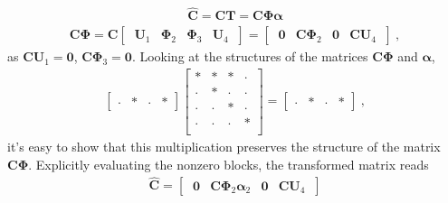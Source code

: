 \documentclass[letterpaper,10pt,english]{jupyterBook}
\begin{document}
\sphinxAtStartPar
{}
\begin{equation*}
\begin{split}\hat{\mathbf{C}} = \mathbf{C} \mathbf{T} = \mathbf{C} \boldsymbol\Phi \boldsymbol\alpha\end{split}
\end{equation*}\begin{equation*}
\begin{split}\mathbf{C} \boldsymbol\Phi = \mathbf{C} \begin{bmatrix} \ \mathbf{U}_1 & \boldsymbol\Phi_2 & \boldsymbol\Phi_3 & \mathbf{U}_4 \ \end{bmatrix} = \begin{bmatrix} \ \mathbf{0}   & \mathbf{C} \boldsymbol\Phi_2 & \mathbf{0} & \mathbf{C} \mathbf{U}_4 \ \end{bmatrix} \ ,\end{split}
\end{equation*}
\sphinxAtStartPar
as \(\mathbf{C} \mathbf{U}_1 = \mathbf{0}\), \(\mathbf{C} \boldsymbol\Phi_3 = \mathbf{0}\). Looking at the structures of the matrices \(\mathbf{C} \boldsymbol\Phi\) and \(\boldsymbol\alpha\),
\begin{equation*}
\begin{split}
\begin{bmatrix} \cdot & \ast & \cdot & \ast \end{bmatrix}
\begin{bmatrix} 
  \ast  & \ast  & \ast  & \cdot \\
  \cdot & \ast  & \cdot & \cdot \\
  \cdot & \cdot & \ast  & \cdot \\
  \cdot & \cdot & \cdot & \ast  \\
\end{bmatrix} = 
\begin{bmatrix} \cdot & \ast & \cdot & \ast \end{bmatrix} \ ,
\end{split}
\end{equation*}
\sphinxAtStartPar
it’s easy to show that this multiplication preserves the structure of the matrix \(\mathbf{C}\boldsymbol\Phi\). Explicitly evaluating the non\sphinxhyphen{}zero blocks, the transformed matrix reads
\begin{equation*}
\begin{split}\hat{\mathbf{C}} = \begin{bmatrix} \ \mathbf{0} & \mathbf{C} \boldsymbol\Phi_2 \boldsymbol\alpha_2 & \mathbf{0} & \mathbf{C}\mathbf{U}_4 \ \end{bmatrix}\end{split}
\end{equation*}
\end{document}
